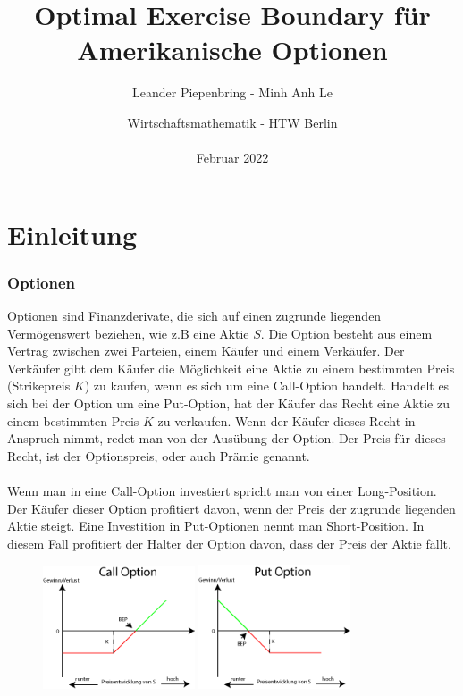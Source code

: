 \documentclass[12pt,a4paper]{article}
\title{Optimal Exercise Boundary für Amerikanische Optionen}
\author{Leander Piepenbring - Minh Anh Le }
\date{Wirtschaftsmathematik - HTW Berlin\\\\Februar 2022 }
\begin{document}
\setcounter{tocdepth}{1}
\newpage
\maketitle
\newpage
\tableofcontents
\newpage
\listoffigures   
\newpage
\part{\centering Einleitung}
\section{Optionen}
\begin{text}

Optionen sind Finanzderivate, die sich auf einen zugrunde liegenden\\ Vermögenswert beziehen, wie z.B eine Aktie $S$. Die Option besteht aus einem Vertrag zwischen zwei Parteien, einem Käufer und einem Verkäufer. Der Verkäufer gibt dem Käufer die Möglichkeit eine Aktie zu einem bestimmten Preis (Strikepreis $K$) zu kaufen, wenn es sich um eine Call-Option handelt. Handelt es sich bei der Option um eine Put-Option, hat der Käufer das Recht eine Aktie zu einem bestimmten Preis $K$ zu verkaufen. Wenn der Käufer dieses Recht in Anspruch nimmt, redet man von der Ausübung der Option. Der Preis für dieses Recht, ist der Optionspreis, oder auch Prämie genannt.
\\\\
Wenn man in eine Call-Option investiert spricht man von einer Long-Position. Der Käufer dieser Option profitiert davon, wenn der Preis der zugrunde liegenden Aktie steigt. Eine Investition in Put-Optionen nennt man Short-Position. In diesem Fall profitiert der Halter der Option davon, dass der Preis der Aktie fällt.
\\[0.3cm]
\begin{figure}[h]
\begin{center}
 \includegraphics[width=0.4\textwidth]{CallOption.png}
 \includegraphics[width=0.4\textwidth]{PutOption.png}

\end{center}
\end{figure}
\end{text}
\end{document}
